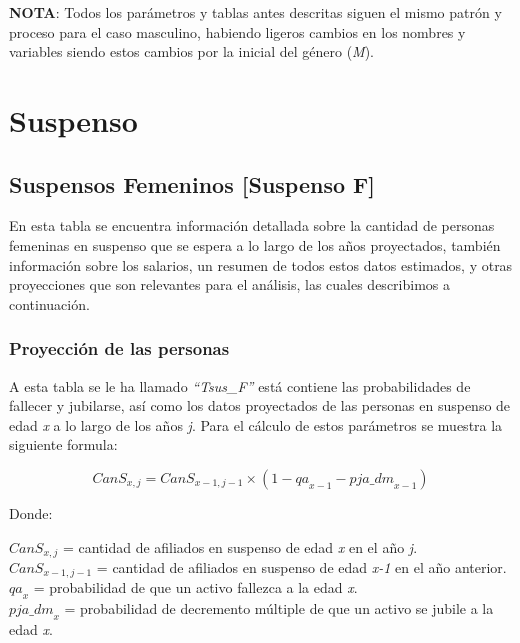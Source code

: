 \documentclass[
  letterpaper,
  DIV=11,
  numbers=noendperiod]{scrreprt}
\begin{document}
\textbf{NOTA}: Todos los parámetros y tablas antes descritas siguen el
mismo patrón y proceso para el caso masculino, habiendo ligeros cambios
en los nombres y variables siendo estos cambios por la inicial del
género (\emph{M}).


\hypertarget{suspenso}{%
\chapter{Suspenso}\label{suspenso}}

\hypertarget{suspensos-femeninos-suspenso-f}{%
\section{Suspensos Femeninos {[}Suspenso
F{]}}\label{suspensos-femeninos-suspenso-f}}

En esta tabla se encuentra información detallada sobre la cantidad de
personas femeninas en suspenso que se espera a lo largo de los años
proyectados, también información sobre los salarios, un resumen de todos
estos datos estimados, y otras proyecciones que son relevantes para el
análisis, las cuales describimos a continuación.

\hypertarget{proyecciuxf3n-de-las-personas-1}{%
\subsection{Proyección de las
personas}\label{proyecciuxf3n-de-las-personas-1}}

A esta tabla se le ha llamado \emph{``Tsus\_F''} está contiene las
probabilidades de fallecer y jubilarse, así como los datos proyectados
de las personas en suspenso de edad \emph{x} a lo largo de los años
\emph{j}. Para el cálculo de estos parámetros se muestra la siguiente
formula:

\begin{equation}
Ca{nS}_{x,j}=Ca{nS}_{x-1,j-1}\times\left(1-{qa}_{x-1}-p{ja\_dm}_{x-1}\right)
\end{equation}

Donde:

\(Ca{nS}_{x,j}\) = cantidad de afiliados en suspenso de edad \emph{x} en
el año \emph{j}.\\
\({CanS}_{x-1,j-1}\) = cantidad de afiliados en suspenso de edad
\emph{x-1} en el año anterior.\\
\({qa}_x\) = probabilidad de que un activo fallezca a la edad
\emph{x}.\\
\(p{ja\_dm}_x\) = probabilidad de decremento múltiple de que un activo
se jubile a la edad \emph{x}.
\end{document}
